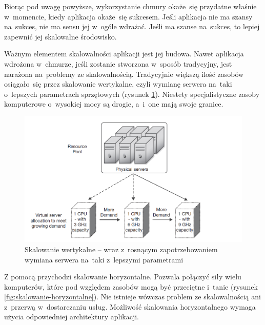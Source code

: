 \documentclass[12pt,a4paper,twoside,titlepage,openright]{book}
\begin{document}
Biorąc pod uwagę powyższe, wykorzystanie chmury okaże~się przydatne właśnie w~momencie, kiedy aplikacja okaże~się sukcesem. Jeśli aplikacja nie ma szansy na~sukces, nie ma sensu jej w~ogóle  wdrażać. Jeśli ma szanse na~sukces, to lepiej zapewnić jej skalowalne środowisko.

Ważnym elementem skalowalności aplikacji jest jej budowa. Nawet aplikacja wdrożona w~chmurze, jeśli zostanie stworzona w~sposób tradycyjny, jest narażona na~problemy ze skalowalnością. Tradycyjnie większą ilość zasobów osiągało~się przez skalowanie wertykalne, czyli wymianę serwera na~taki o~lepszych parametrach sprzętowych (rysunek \ref{fig:skalowanie-wertykalne}). Niestety specjalistyczne zasoby komputerowe o~wysokiej mocy są drogie, a~i~one mają swoje granice. 

\begin{figure}[h!]
	\centering
			\includegraphics[width=\textwidth]{skalowanie-wertykalne.png}
		\caption{Skalowanie wertykalne -- wraz z~rosnącym zapotrzebowaniem wymiana serwera na~taki z~lepszymi parametrami \cite{ccCambridge}}
		\label{fig:skalowanie-wertykalne}
\end{figure}

Z pomocą przychodzi skalowanie horyzontalne. Pozwala połączyć siły wielu komputerów, które pod względem zasobów mogą być przeciętne i~tanie (rysunek \ref{fig:skalowanie-horyzontalne}). Nie istnieje wówczas problem ze skalowalnością ani z~przerwą w~dostarczaniu usług. Możliwość skalowania horyzontalnego wymaga użycia odpowiedniej architektury aplikacji.
\end{document}
